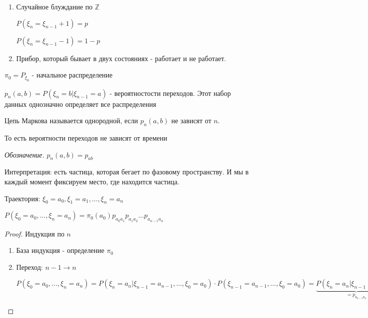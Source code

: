 \begin{example}
    \begin{enumerate}
        \item {
            Случайное блуждание по $\mathbb{Z}$

            $P(\xi_n = \xi_{n-1} + 1) = p$
            
            $P(\xi_n = \xi_{n-1} - 1) = 1 - p$
        }
        \item {
            Прибор, который бывает в двух состояниях - работает и не работает.

        }
    \end{enumerate}
    \begin{remark}
        $\pi_0 = P_{\xi_0}$ - начальное распределение

        $p_n (a, b) = P(\xi_n = b | \xi_{n - 1} = a)$ - вероятностости переходов. Этот набор данных однозначно определяет все распределения
    \end{remark}
\end{example}

\begin{definition}
    Цепь Маркова называется однородной, если $p_n (a, b)$ не зависят от $n$. 

    То есть вероятности переходов не зависят от времени

    \textit{Обозначение.} $p_n (a, b) = p_{ab}$
\end{definition}

\begin{remark}
    Интерпретация: есть частица, которая бегает по фазовому пространству. И мы в каждый момент фиксируем место, где находится частица.
\end{remark}

\begin{definition}
    Траектория: $\xi_0 = a_0, \xi_1 = a_1, \ldots, \xi_n = a_n$
\end{definition}

\begin{theorem}
    $P(\xi_0 = a_0, \ldots, \xi_n = a_n) = \pi_0(a_0)p_{a_0a_1}p_{a_1a_2}\ldots p_{a_{n-1}a_n}$
\end{theorem}

\begin{proof}
    Индукция по $n$

    \begin{enumerate}
        \item База индукция - определение $\pi_0$
        \item {
            Переход: $n - 1 \to n$

            $P(\xi_0 = a_0, \ldots, \xi_n = a_n) = P(\xi_n = a_n | \xi_{n - 1} = a_{n-1}, \ldots, \xi_0 = a_0) \cdot P(\xi_{n - 1} = a_{n-1}, \ldots, \xi_0 = a_0) 
            = \underbrace{P(\xi_n = a_n | \xi_{n - 1} = a_{n-1})}_{=p_{a_{n-1}a_n}} \cdot \pi_0 (a_0) p_{a_0a_1} \ldots p_{a_{n-2}a_{n-1}}$
        }
    \end{enumerate}
\end{proof}

